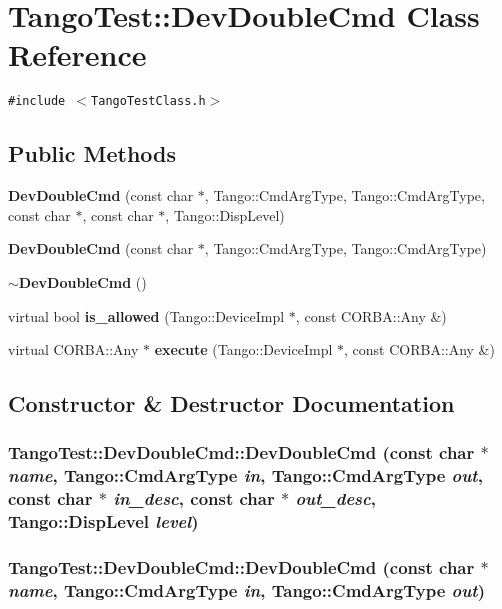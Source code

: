 \section{Tango\-Test::Dev\-Double\-Cmd  Class Reference}
\label{classTangoTest_1_1DevDoubleCmd}
{\tt \#include $<$Tango\-Test\-Class.h$>$}

\subsection*{Public Methods}
\begin{CompactItemize}
\item 
{\bf Dev\-Double\-Cmd} (const char $\ast$, Tango::Cmd\-Arg\-Type, Tango::Cmd\-Arg\-Type, const char $\ast$, const char $\ast$, Tango::Disp\-Level)
\item 
{\bf Dev\-Double\-Cmd} (const char $\ast$, Tango::Cmd\-Arg\-Type, Tango::Cmd\-Arg\-Type)
\item 
{\bf $\sim$Dev\-Double\-Cmd} ()
\item 
virtual bool {\bf is\_\-allowed} (Tango::Device\-Impl $\ast$, const CORBA::Any \&)
\item 
virtual CORBA::Any $\ast$ {\bf execute} (Tango::Device\-Impl $\ast$, const CORBA::Any \&)
\end{CompactItemize}


\subsection{Constructor \& Destructor Documentation}
\subsubsection{\setlength{\rightskip}{0pt plus 5cm}Tango\-Test::Dev\-Double\-Cmd::Dev\-Double\-Cmd (const char $\ast$ {\em name}, Tango::Cmd\-Arg\-Type {\em in}, Tango::Cmd\-Arg\-Type {\em out}, const char $\ast$ {\em in\_\-desc}, const char $\ast$ {\em out\_\-desc}, Tango::Disp\-Level {\em level})}\label{classTangoTest_1_1DevDoubleCmd_a0}


\subsubsection{\setlength{\rightskip}{0pt plus 5cm}Tango\-Test::Dev\-Double\-Cmd::Dev\-Double\-Cmd (const char $\ast$ {\em name}, Tango::Cmd\-Arg\-Type {\em in}, Tango::Cmd\-Arg\-Type {\em out})}\label{classTangoTest_1_1DevDoubleCmd_a1}


